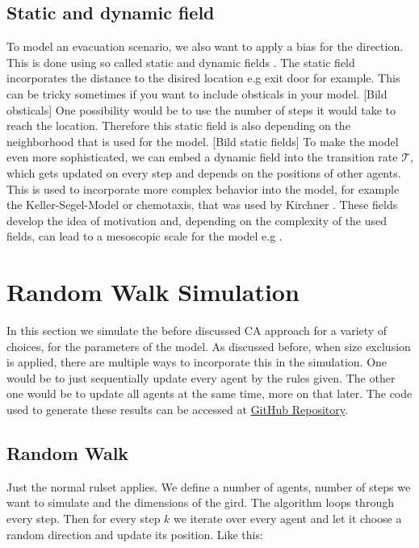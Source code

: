 \subsection{Static and dynamic field}
To model an evacuation scenario, we also want to apply a bias for the direction. This is done using so called static and dynamic fields \autocite{Michi}. 
The static field incorporates the distance to the disired location e.g exit door for example.
This can be tricky sometimes if you want to include obsticals in your model. [Bild obsticals]
One possibility would be to use the number of steps it would take to reach the location. 
Therefore this static field is also depending on the neighborhood that is used for the model. [Bild static fields]
To make the model even more sophisticated, 
we can embed a dynamic field into the transition rate $ \mathcal{T}$, 
which gets updated on every step and depends on the positions of other agents. 
This is used to incorporate more complex behavior into the model, for example the Keller-Segel-Model \autocite{keller1970initiation} or chemotaxis, that was used by Kirchner \autocite{kirchner2002simulation}.
These fields develop the idea of motivation and, depending on the complexity of the used fields, can lead to a mesoscopic scale for the model e.g .

\newpage
\section{Random Walk Simulation}
In this section we simulate the before discussed CA approach for a variety of choices, for the parameters of the model. 
As discussed before, when size exclusion is applied, there are multiple ways to incorporate this in the simulation. 
One would be to just sequentially update every agent by the rules given.
The other one would be to update all agents at the same time, more on that later. 
The code used to generate these results can be accessed at \href{https://github.com/SomeStein/Bachelor-Thesis}{GitHub Repository}.

\subsection{Random Walk}
Just the normal rulset applies. We define a number of agents, number of steps we want to simulate and the dimensions of the gird. 
The algorithm loops through every step. 
Then for every step $k$ we iterate over every agent and let it choose a random direction and update its position. 
Like this: 

